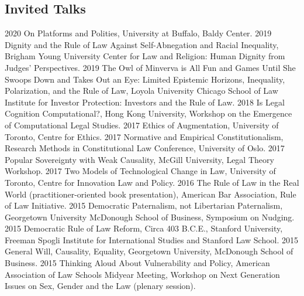 \documentclass[letterpaper]{moderncv}
\begin{document}
\subsection{Invited Talks}
\cvitem
{2020}
{On Platforms and Polities, University at Buffalo, Baldy Center.}
\vspace{1mm}
\cvitem
{2019}
{Dignity and the Rule of Law Against Self-Abnegation and Racial Inequality, Brigham Young University Center for Law and Religion: Human Dignity from Judges' Perspectives.}
\vspace{1mm}
\cvitem
{2019}
{The Owl of Minverva is All Fun and Games Until She Swoops Down and Takes Out an Eye: Limited Epistemic Horizons, Inequality, Polarization, and the Rule of Law, Loyola University Chicago School of Law Institute for Investor Protection: Investors and the Rule of Law.}
\vspace{1mm}
\cvitem
{2018}
{Is Legal Cognition Computational?, Hong Kong University, Workshop on the Emergence of Computational Legal Studies.}
\vspace{1mm}
\cvitem
{2017}
{Ethics of Augmentation, University of Toronto, Centre for Ethics.}
\vspace{1mm}
\cvitem
{2017}
{Normative and Empirical Constitutionalism, Research Methods in Constitutional Law Conference, University of Oslo.}
\vspace{1mm}
\cvitem
{2017}
{Popular Sovereignty with Weak Causality, McGill University, Legal Theory Workshop.}
\vspace{1mm}
\cvitem
{2017}
{Two Models of Technological Change in Law, University of Toronto, Centre for Innovation Law and Policy.}
\vspace{1mm}
\cvitem
{2016}
{The Rule of Law in the Real World (practitioner-oriented book presentation), American Bar Association, Rule of Law Initiative.}
\vspace{1mm}
\cvitem
{2015}
{Democratic Paternalism, not Libertarian Paternalism, Georgetown University McDonough School of Business, Symposium on Nudging.}
\vspace{1mm}
\cvitem
{2015}
{Democratic Rule of Law Reform, Circa 403 B.C.E., Stanford University, Freeman Spogli Institute for International Studies and Stanford Law School.}
\vspace{1mm}
\cvitem
{2015}
{General Will, Causality, Equality, Georgetown University, McDonough School of Business.}
\vspace{1mm}
\cvitem
{2015}
{Thinking Aloud About Vulnerability and Policy, American Association of Law Schools Midyear Meeting, Workshop on Next Generation Issues on Sex, Gender and the Law (plenary session).}
\end{document}
